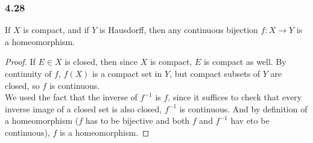 \documentclass[../../main.tex]{subfiles}
\begin{document}
\subsubsection*{4.28}
\begin{wts}
If $X$ is compact, and if $Y$ is Hausdorff, then any continuous bijection $f:X\to Y$ is a homeomorphism.
\end{wts}
\begin{proof}
If $E\in X$ is closed, then since $X$ is compact, $E$ is compact as well. By continuity of $f$, $f(X)$ is a compact set in $Y$, but compact subsets of $Y$ are closed, so $f$ is continuous.\\

We used the fact that the inverse of $f^{-1}$ is $f$, since it suffices to check that every inverse image of a closed set is also closed, $f^{-1}$ is continuous. And by definition of a homeomorphism ($f$ has to be bijective and both $f$ and $f^{-1}$ hav eto be continuous), $f$ is a homeomorphism.
\end{proof}
\end{document}
